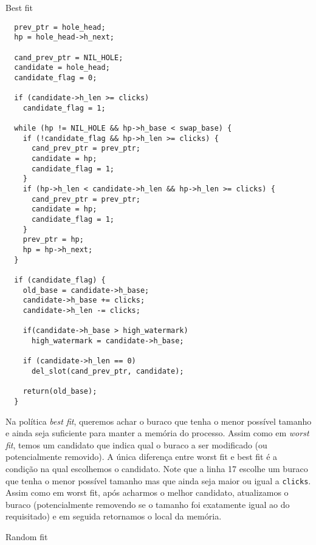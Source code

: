 \documentclass{amsart}
\makeatletter
\def\subsection{\@startsection{subsection}{3}%
  \z@{.5\linespacing\@plus.7\linespacing}{.1\linespacing}%
  {\normalfont}}
\theoremstyle{plain}
\newcommand{\code}[1]{\lstinline[mathescape=true]{#1}}
\makeatother
\begin{document}
\subsection{Best fit}

\begin{verbatim}
  prev_ptr = hole_head;
  hp = hole_head->h_next;

  cand_prev_ptr = NIL_HOLE;
  candidate = hole_head;
  candidate_flag = 0;

  if (candidate->h_len >= clicks)
    candidate_flag = 1;

  while (hp != NIL_HOLE && hp->h_base < swap_base) {
    if (!candidate_flag && hp->h_len >= clicks) {
      cand_prev_ptr = prev_ptr;
      candidate = hp;
      candidate_flag = 1;
    }
    if (hp->h_len < candidate->h_len && hp->h_len >= clicks) {
      cand_prev_ptr = prev_ptr;
      candidate = hp;
      candidate_flag = 1;
    }
    prev_ptr = hp;
    hp = hp->h_next;
  }

  if (candidate_flag) {
    old_base = candidate->h_base;
    candidate->h_base += clicks;
    candidate->h_len -= clicks;

    if(candidate->h_base > high_watermark)
      high_watermark = candidate->h_base;

    if (candidate->h_len == 0)
      del_slot(cand_prev_ptr, candidate);

    return(old_base);
  }
\end{verbatim}

Na política \textit{best fit}, queremos achar o buraco que tenha o menor possível tamanho e ainda
seja suficiente para manter a memória do processo. Assim como em \textit{worst fit}, temos um
candidato que indica qual o buraco a ser modificado (ou potencialmente removido). A única diferença
entre worst fit e best fit é a condição na qual escolhemos o candidato. Note que a linha 17 escolhe
um buraco que tenha o menor possível tamanho mas que ainda seja maior ou igual a \code{clicks}.
Assim como em worst fit, após acharmos o melhor candidato, atualizamos o buraco (potencialmente
removendo se o tamanho foi exatamente igual ao do requisitado) e em seguida retornamos o local da
memória.

\subsection{Random fit}
\end{document}

